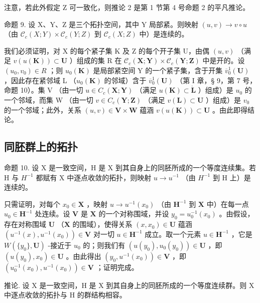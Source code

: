 注意，若此外假定 Z 可一致化，则推论 2 是第 1 节第 4 号命题 2 的平凡推论。

命题 9. 设 X、Y、Z 是三个拓扑空间，其中 Y 局部紧。则映射 \((u, v) \to v \circ u\) （由 \(\mathcal{C}_c(X; Y) \times \mathcal{C}_c(Y; Z)\) 到 \(\mathcal{C}_c(X; Z)\) 中）是连续的。

我们必须证明，对 X 的每个紧子集 K 及 Z 的每个开子集 U，由偶 \((u, v)\) （满足 \(v(u(\mathbf{K})) \subset \mathbf{U}\) ）组成的集 R 在 \(\mathcal{C}_{c}(\mathbf{X}; \mathbf{Y}) \times \mathcal{C}_{c}(\mathbf{Y}; \mathbf{Z})\) 中是开的。设 \((u_{0}, v_{0}) \in R\) ；则 \(u_{0}(\mathbf{K})\) 是局部紧空间 Y 的一个紧子集，含于开集 \(\overline{v}_{0}^{1}(\mathbf{U})\) ，因此存在紧邻域 L （\(u_{0}(\mathbf{K})\) 的邻域）含于 \(\overline{v}_{0}^{1}(\mathbf{U})\) （第 I 章，§ 9，第 7 号，命题 10）。集 V （由一切 \(u \in C_{c}(\mathbf{X}; \mathbf{Y})\) （满足 \(u(\mathbf{K}) \subset \mathring{\mathbf{L}}\) ）组成）是 \(u_{0}\) 的一个邻域，而集 W （由一切 \(v \in C_{c}(\mathbf{Y}; \mathbf{Z})\) （满足 \(v(\mathbf{L}) \subset \mathbf{U}\) ）组成）是 \(v_{0}\) 的一个邻域；此外，关系 \((u, v) \in \mathbf{V} \times \mathbf{W}\) 蕴涵 \(v(u(\mathbf{K})) \subset \mathbf{U}\) 。由此即得结论。

\subsection{同胚群上的拓扑}

命题 10. 设 X 是一致空间，H 是 X 到其自身上的同胚所成的一个等度连续集。若 H 与 \(H^{-1}\) 都赋有 X 中逐点收敛的拓扑，则映射 \(u \rightarrow u^{-1}\) （由 \(H^{-1}\) 到 H 上）是连续的。

只需证明，对每个 \(x_0 \in \mathbf{X}\) ，映射 \(u \to u^{-1}(x_0)\) （由 \(\mathbf{H}^{-1}\) 到 \(\mathbf{X}\) 中）在每一点 \(u_0 \in \mathbf{H}^{-1}\) 处连续。设 \(\mathbf{V}\) 是 \(\mathbf{X}\) 的一个对称围域，并设 \(y_0 = u_0^{-1}(x_0)\) 。由假设，存在对称围域 \(\mathbf{U}\) （\(\mathbf{X}\) 的围域），使得关系 \((x, x_0) \in \mathbf{U}\) 蕴涵 \((u^{-1}(x), u^{-1}(x_0)) \in \mathbf{V}\) 对一切 \(u \in \mathbf{H}^{-1}\) 成立。取一个元素 \(u \in \mathbf{H}^{-1}\) ，它是 \(W(\{y_0\}, \mathbf{U})\) -接近于 \(u_0\) 的；则我们有 \((u(y_0), u_0(y_0)) \in \mathbf{U}\) ，即 \((u(y_0), x_0) \in \mathbf{U}\) 。由此得出 \((y_0, u^{-1}(x_0)) \in \mathbf{V}\) ，即 \((u_0^{-1}(x_0), u^{-1}(x_0)) \in \mathbf{V}\) ；证明完成。

推论. 设 X 是一致空间，H 是 X 到其自身上的同胚所成的一个等度连续群。则 X 中逐点收敛的拓扑与 H 的群结构相容。

